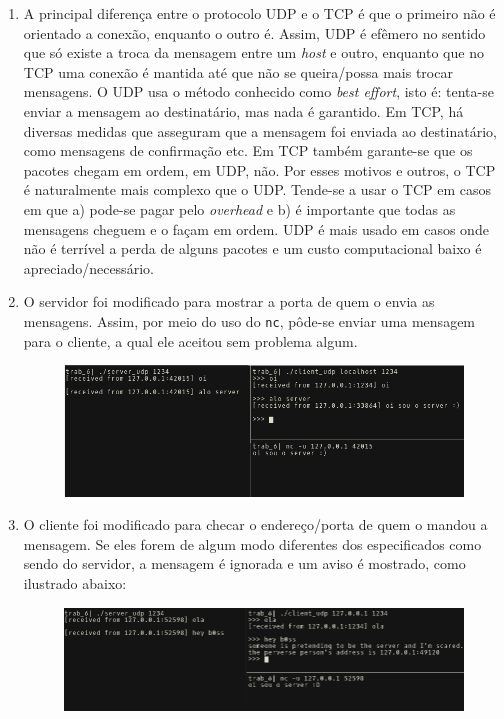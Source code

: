 \documentclass[11pt]{article}
\newcommand{\tit}[1]{\textit{#1}}
\newcommand{\ttt}[1]{\texttt{#1}}
\begin{document}
\begin{enumerate}
\item A principal diferença entre o protocolo UDP e o TCP é que o primeiro
não é orientado a conexão, enquanto o outro é. Assim, UDP é efêmero no sentido
que só existe a troca da mensagem entre um \tit{host} e outro, enquanto que no
TCP uma conexão é mantida até que não se queira/possa mais trocar mensagens.
O UDP usa o método conhecido como \tit{best effort}, isto é: 
tenta-se enviar a mensagem ao destinatário,
mas nada é garantido. Em TCP, há diversas medidas que asseguram que a mensagem
foi enviada ao destinatário, como mensagens de confirmação etc.
Em TCP também garante-se que os pacotes chegam em ordem, em UDP, não.
Por esses motivos e outros, o TCP é naturalmente mais complexo que o UDP. 
Tende-se a usar o TCP em casos em que a) pode-se pagar pelo \tit{overhead} e
b) é importante que todas as mensagens cheguem e o façam em ordem. UDP é mais
usado em casos onde não é terrível a perda de alguns pacotes e um custo
computacional baixo é apreciado/necessário.

\item O servidor foi modificado para mostrar a porta de quem o envia as 
	mensagens. Assim, por meio do uso do \ttt{nc}, pôde-se enviar uma 
	mensagem para o cliente, a qual ele aceitou sem problema algum.
\begin{figure}[H]
	\centering
	\includegraphics[width=1.0\linewidth]{img/malicia.png}
\end{figure}

\item O cliente foi modificado para checar o endereço/porta de quem o mandou
	a mensagem. Se eles forem de algum modo diferentes dos especificados como
	sendo do servidor, a mensagem é ignorada e um aviso é mostrado, como
	ilustrado abaixo:
\begin{figure}[H]
	\centering
	\includegraphics[width=1.0\linewidth]{img/tepeguei.png}
\end{figure}


\end{enumerate}
\end{document}
